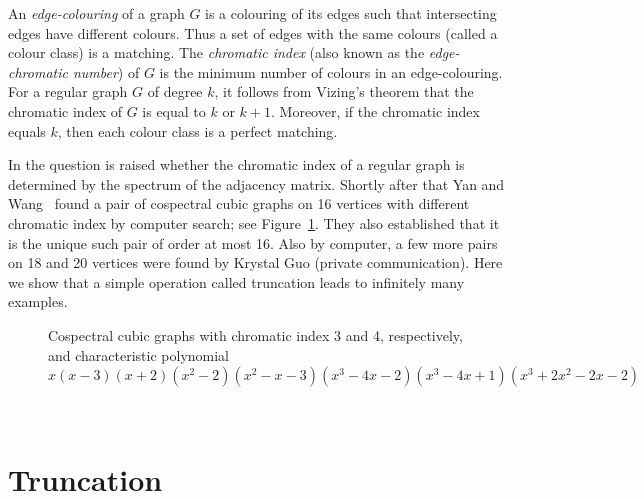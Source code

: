 \documentclass{article}
\begin{document}
An {\em edge-colouring} of a graph $G$ is a colouring of its edges such that intersecting edges
have different colours. 
Thus a set of edges with the same colours (called a colour class) is a matching.
The {\em chromatic index} (also known as the {\em edge-chromatic number}) of $G$ is the minimum number of colours in an edge-colouring. 
For a regular graph $G$ of degree $k$, it follows from Vizing's theorem \cite{V} that the chromatic index of $G$ is equal to $k$ or $k+1$.
Moreover, if the chromatic index equals $k$, then each colour class is a perfect matching.

In \cite{EH} the question is raised whether the chromatic index 
of a regular graph is determined by the spectrum of the adjacency matrix.
Shortly after that Yan and Wang~\cite{YW} found a pair of cospectral cubic graphs on 16 vertices with different chromatic index by computer search; see Figure~\ref{GH}.
They also established that it is the unique such pair of order at most 16.
Also by computer, a few more pairs on 18 and 20 vertices were found by Krystal Guo (private communication).
Here we show that a simple operation called truncation leads to infinitely many examples.
%
\begin{figure}[ht]
\begin{center}
\hspace{30pt}
\caption{Cospectral cubic graphs with chromatic index 3 and 4, 
respectively, and characteristic polynomial 
$x(x-3)(x+2)(x^2-2)(x^2-x-3)(x^3-4x-2)(x^3-4x+1)(x^3+2x^2-2x-2)$ 
}\label{GH}
\end{center}
\end{figure}
%
~\\[-30pt]

\section{Truncation}
\end{document}
